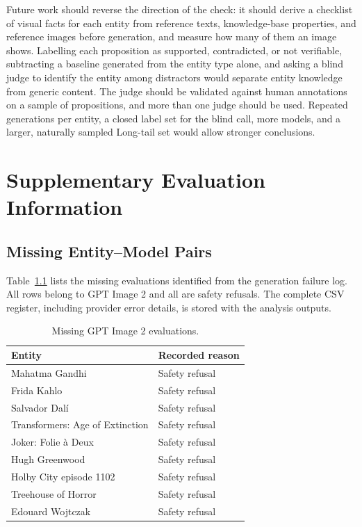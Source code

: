 Future work should reverse the direction of the check: it should derive a
checklist of visual facts for each entity from reference texts, knowledge-base
properties, and reference images before generation, and measure how many of
them an image shows. Labelling each proposition as supported, contradicted, or
not verifiable, subtracting a baseline generated from the entity type alone, and
asking a blind judge to identify the entity among distractors would separate
entity knowledge from generic content. The judge should be validated against
human annotations on a sample of propositions, and more than one judge should be
used. Repeated generations per entity, a closed label set for the blind call,
more models, and a larger, naturally sampled Long-tail set would allow stronger
conclusions.

\appendix
\chapter{Supplementary Evaluation Information}

\section{Missing Entity--Model Pairs}

Table~\ref{tab:missing-eval} lists the missing evaluations identified from the
generation failure log. All rows belong to GPT Image 2 and all are safety
refusals. The complete CSV register, including provider error details, is stored
with the analysis outputs.

\begin{table}[ht]
\centering
\caption{Missing GPT Image 2 evaluations.}
\label{tab:missing-eval}
\begin{tabular}{lp{4.7cm}}
\toprule
Entity & Recorded reason \\
\midrule
Mahatma Gandhi & Safety refusal \\
Frida Kahlo & Safety refusal \\
Salvador Dal\'{i} & Safety refusal \\
Transformers: Age of Extinction & Safety refusal \\
Joker: Folie à Deux & Safety refusal \\
Hugh Greenwood & Safety refusal \\
Holby City episode 1102 & Safety refusal \\
Treehouse of Horror & Safety refusal \\
Edouard Wojtczak & Safety refusal \\
\bottomrule
\end{tabular}
\end{table}

